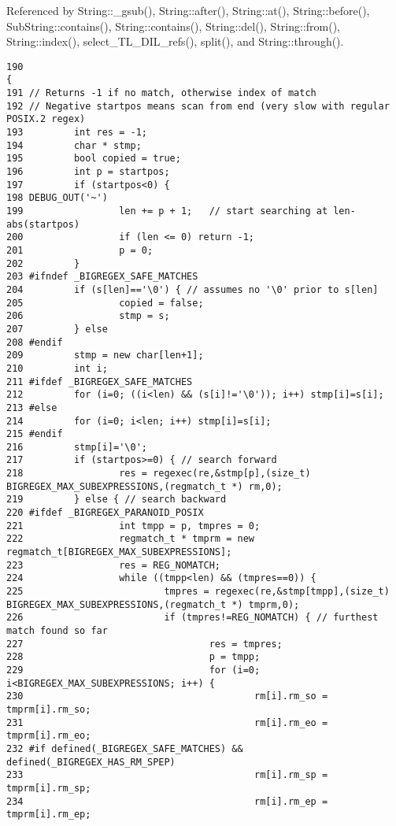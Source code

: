 Referenced by String::\_\-gsub(), String::after(), String::at(), String::before(), Sub\-String::contains(), String::contains(), String::del(), String::from(), String::index(), select\_\-TL\_\-DIL\_\-refs(), split(), and String::through().



\footnotesize\begin{verbatim}190                                                                               {
191 // Returns -1 if no match, otherwise index of match
192 // Negative startpos means scan from end (very slow with regular POSIX.2 regex)
193         int res = -1;
194         char * stmp;
195         bool copied = true;
196         int p = startpos;
197         if (startpos<0) {
198 DEBUG_OUT('~')
199                 len += p + 1;   // start searching at len-abs(startpos)
200                 if (len <= 0) return -1;
201                 p = 0;
202         }
203 #ifndef _BIGREGEX_SAFE_MATCHES
204         if (s[len]=='\0') { // assumes no '\0' prior to s[len]
205                 copied = false;
206                 stmp = s;
207         } else
208 #endif
209         stmp = new char[len+1];
210         int i;
211 #ifdef _BIGREGEX_SAFE_MATCHES
212         for (i=0; ((i<len) && (s[i]!='\0')); i++) stmp[i]=s[i];
213 #else
214         for (i=0; i<len; i++) stmp[i]=s[i];
215 #endif
216         stmp[i]='\0';
217         if (startpos>=0) { // search forward
218                 res = regexec(re,&stmp[p],(size_t) BIGREGEX_MAX_SUBEXPRESSIONS,(regmatch_t *) rm,0);
219         } else { // search backward
220 #ifdef _BIGREGEX_PARANOID_POSIX
221                 int tmpp = p, tmpres = 0;
222                 regmatch_t * tmprm = new regmatch_t[BIGREGEX_MAX_SUBEXPRESSIONS];
223                 res = REG_NOMATCH;
224                 while ((tmpp<len) && (tmpres==0)) {
225                         tmpres = regexec(re,&stmp[tmpp],(size_t) BIGREGEX_MAX_SUBEXPRESSIONS,(regmatch_t *) tmprm,0);
226                         if (tmpres!=REG_NOMATCH) { // furthest match found so far
227                                 res = tmpres;
228                                 p = tmpp;
229                                 for (i=0; i<BIGREGEX_MAX_SUBEXPRESSIONS; i++) {
230                                         rm[i].rm_so = tmprm[i].rm_so;
231                                         rm[i].rm_eo = tmprm[i].rm_eo;
232 #if defined(_BIGREGEX_SAFE_MATCHES) && defined(_BIGREGEX_HAS_RM_SPEP)
233                                         rm[i].rm_sp = tmprm[i].rm_sp;
234                                         rm[i].rm_ep = tmprm[i].rm_ep;

\end{verbatim}
